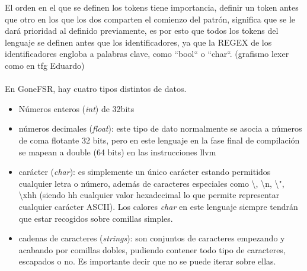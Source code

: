 \noindent El orden en el que se definen los tokens tiene importancia, definir un token antes que otro en los que los dos comparten el comienzo del patrón, significa que se le dará prioridad al definido previamente, es por esto que todos los tokens del lenguaje se definen antes que los identificadores, ya que la REGEX de los identificadores engloba a palabras clave, como ``bool`` o ``char``. (grafismo lexer como en tfg Eduardo)
\\\\
En GoneFSR, hay cuatro tipos distintos de datos. 
\begin{itemize}
    \item{Números enteros (\textit{int}) de 32bits}
    \item{números decimales (\textit{float}): este tipo de dato normalmente se asocia a números de coma flotante 32 bits, pero en este lenguaje en la fase final de compilación se mapean a double (64 bits) en las instrucciones llvm}
    \item{carácter (\textit{char}):  es simplemente un único carácter estando permitidos cualquier letra o número, además de caracteres especiales como \textbackslash, \textbackslash n, \textbackslash ", \textbackslash xhh (siendo hh cualquier valor hexadecimal lo que permite representar cualquier carácter ASCII). Los calores \textit{char} en este lenguaje siempre tendrán que estar recogidos sobre comillas simples.}
    \item{cadenas de caracteres (\textit{strings}): son conjuntos de caracteres empezando y acabando por comillas dobles, pudiendo contener todo tipo de caracteres, escapados o no. Es importante decir que no se puede iterar sobre ellas. }\\ 
\end{itemize}
